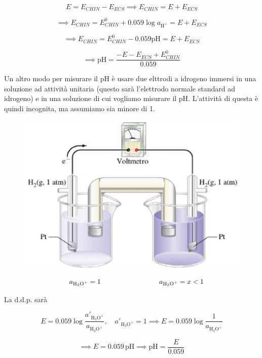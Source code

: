 $$E= E_{CHIN} - E_{ECS} \implies E_{CHIN}= E + E_{ECS}$$

$$\implies E_{CHIN} = E^{0}_{CHIN} + 0.059 \log a_{\text{H}^+} = E + E_{ECS}$$

$$\implies E_{CHIN} = E^{0}_{CHIN} - 0.059 \text{pH} = E + E_{ECS}$$

$$\implies \text{pH} = \frac{-E - E_{ECS} + E^0_{CHIN}}{0.059}$$

Un altro modo per misurare il pH è usare due elttrodi a idrogeno  immersi in una soluzione ad attività unitaria (questo sarà l'elettrodo normale standard ad idrogeno) e in una soluzione di cui vogliamo misurare il pH. L'attività di questa è quindi incognita, ma assumiamo sia minore di 1.

\begin{figure}[H]
    \centering
    \includegraphics[width=12cm]{immagini/elettrodo_pH.png}
\end{figure}

\vspace{-1cm}$$\hspace{0.5cm}a_{\text{H}_3\text{O}^+}= 1 \hspace{3cm} a_{\text{H}_3\text{O}^+}=x<1$$

La d.d.p. sarà

$$E = 0.059 \log \frac{a'_{\text{H}_3\text{O}^+}}{a_{\text{H}_3\text{O}^+}}, \quad a'_{\text{H}_3\text{O}^+}=1 \implies E = 0.059 \log \frac{1}{a_{\text{H}_3\text{O}^+}}$$

$$ \implies E= 0.059 \, \text{pH} \implies \text{pH} = \frac{E}{0.059}$$


